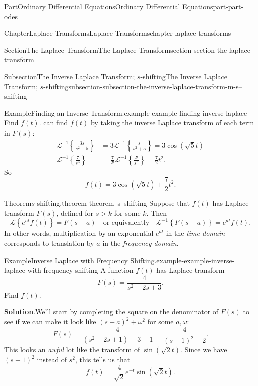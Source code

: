 \documentclass[twoside,10pt,]{book}
\newcommand{\blocktitlefont}{\relax}
\numberwithin{equation}{part}
\newcommand{\Laplace}[1]{\mathcal{L}\set{#1}}
\newcommand{\iLaplace}[1]{\mathcal{L}^{-1}\set{#1}}
\newcommand{\set}[1]{\left\{ #1 \right\}}
\newcommand{\qq}[1]{\quad\text{#1}\quad}
\newcommand{\gt}{>}
\begin{document}
\begin{partptx}{Part}{Ordinary Differential Equations}{}{Ordinary Differential Equations}{}{}{part-part-odes}
\begin{chapterptx}{Chapter}{Laplace Transforms}{}{Laplace Transforms}{}{}{chapter-laplace-transforms}
\begin{sectionptx}{Section}{The Laplace Transform}{}{The Laplace Transform}{}{}{section-section-the-laplace-transform}
\begin{subsectionptx}{Subsection}{The Inverse Laplace Transform; \(s\)-shifting}{}{The Inverse Laplace Transform; \(s\)-shifting}{}{}{subsection-subsection-the-inverse-laplace-transform-m-s--shifting}
\begin{example}{Example}{Finding an Inverse Transform.}{example-example-finding-inverse-laplace}
\begin{equation*}
\end{equation*}
Find \(f(t)\).%
\noindentWe can find \(f(t)\) by taking the inverse Laplace transform of each term in \(F(s)\):%
\begin{align*}
\iLaplace{\frac{3s}{s^{2}+5}} &= 3\iLaplace{\frac{s}{s^{2}+5}} = 3\cos(\sqrt{5}t)\\
\iLaplace{\frac{7}{s^{3}}} &= \frac{7}{2!}\iLaplace{\frac{2!}{s^{3}}} = \frac{7}{2}t^{2}\text{.}
\end{align*}
So%
\begin{equation*}
f(t) = 3\cos(\sqrt{5}t)+\frac{7}{2}t^{2}.
\end{equation*}
%
\end{example}
\begin{theorem}{Theorem}{\(s\)-shifting.}{}{theorem-theorem--s--shifting}%
Suppose that \(f(t)\) has Laplace transform \(F(s)\), defined for \(s\gt k\) for some \(k\). Then%
\begin{equation*}
\Laplace{e^{at}f(t)} = F(s-a)\qq{or equivalently} \iLaplace{F(s-a)} = e^{at}f(t).
\end{equation*}
In other words, multiplication by an exponential \(e^{at}\) in the \emph{time domain} corresponds to translation by \(a\) in the \emph{frequency domain}.%
\end{theorem}
\begin{example}{Example}{Inverse Laplace with Frequency Shifting.}{example-example-inverse-laplace-with-frequency-shifting}%
A function \(f(t)\) has Laplace transform%
\begin{equation*}
F(s) = \frac{4}{s^{2}+2s+3}.
\end{equation*}
Find \(f(t)\).%
\par\smallskip%
\noindent\textbf{\blocktitlefont Solution}.\hypertarget{solution-example-inverse-laplace-with-frequency-shifting-c}{}\quad{}We'll start by completing the square on the denominator of \(F(s)\) to see if we can make it look like \((s-a)^{2}+\omega^{2}\) for some \(a,\omega\):%
\begin{equation*}
F(s) = \frac{4}{(s^{2}+2s+1)+3-1} = \frac{4}{(s+1)^{2}+2}.
\end{equation*}
This looks an \emph{awful} lot like the transform of \(\sin(\sqrt{2}t)\). Since we have \((s+1)^{2}\) instead of \(s^{2}\), this tells us that%
\begin{equation*}
f(t) = \frac{4}{\sqrt{2}}e^{-t}\sin(\sqrt{2}t).
\end{equation*}
%
\end{example}

\end{subsectionptx}
\end{sectionptx}
\end{chapterptx}
\end{partptx}
\end{document}
